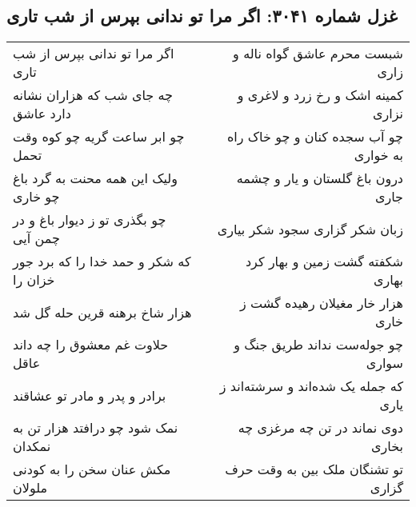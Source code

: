 \begin{center}
\section*{غزل شماره ۳۰۴۱: اگر مرا تو ندانی بپرس از شب تاری}
\label{sec:3041}
\begin{longtable}{l p{0.5cm} r}
اگر مرا تو ندانی بپرس از شب تاری
&&
شبست محرم عاشق گواه ناله و زاری
\\
چه جای شب که هزاران نشانه دارد عاشق
&&
کمینه اشک و رخ زرد و لاغری و نزاری
\\
چو ابر ساعت گریه چو کوه وقت تحمل
&&
چو آب سجده کنان و چو خاک راه به خواری
\\
ولیک این همه محنت به گرد باغ چو خاری
&&
درون باغ گلستان و یار و چشمه جاری
\\
چو بگذری تو ز دیوار باغ و در چمن آیی
&&
زبان شکر گزاری سجود شکر بیاری
\\
که شکر و حمد خدا را که برد جور خزان را
&&
شکفته گشت زمین و بهار کرد بهاری
\\
هزار شاخ برهنه قرین حله گل شد
&&
هزار خار مغیلان رهیده گشت ز خاری
\\
حلاوت غم معشوق را چه داند عاقل
&&
چو جوله‌ست نداند طریق جنگ و سواری
\\
برادر و پدر و مادر تو عشاقند
&&
که جمله یک شده‌اند و سرشته‌اند ز یاری
\\
نمک شود چو درافتد هزار تن به نمکدان
&&
دوی نماند در تن چه مرغزی چه بخاری
\\
مکش عنان سخن را به کودنی ملولان
&&
تو تشنگان ملک بین به وقت حرف گزاری
\\
\end{longtable}
\end{center}
